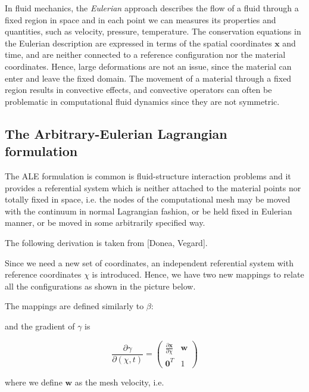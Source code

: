\documentclass[a4paper,11pt,openright,twoside]{book}
\begin{document}
In fluid mechanics, the \emph{Eulerian} approach describes the flow of a fluid through a fixed region in space and in each point we can measures its properties and quantities, such as velocity, pressure, temperature. The conservation equations in the Eulerian description are expressed in terms of the spatial coordinates $\mathbf{x}$ and time, and are neither connected to a reference configuration nor the material coordinates. Hence, large deformations are not an issue, since the material can enter and leave the fixed domain. The movement of a material through a fixed region results in convective effects, and convective operators can often be problematic in computational fluid dynamics since they are not symmetric.


\subsection{The Arbitrary-Eulerian Lagrangian formulation}
The ALE formulation is common is fluid-structure interaction problems and it provides a referential system which is neither attached to the material points nor totally fixed in space, i.e. the nodes of the computational mesh may be moved with the continuum in normal Lagrangian fashion, or be held fixed in Eulerian manner, or be moved in some arbitrarily specified way.

The following derivation is taken from [Donea, Vegard].

Since we need a new set of coordinates, an independent referential system with reference coordinates $\chi$ is introduced. Hence, we have two new mappings to relate all the configurations as shown in the picture below.


The mappings are defined similarly to $\beta$:


and the gradient of $\gamma$ is 

\begin{equation}
\frac{\partial \gamma}{\partial(\chi, t)} = 
\begin{pmatrix}
\frac{\partial \mathbf{x}}{\partial \chi} & \mathbf{w} \\
\mathbf{0}^T & 1
\end{pmatrix}
\end{equation}

where we define $\mathbf{w}$ as the mesh velocity, i.e.
\end{document}
